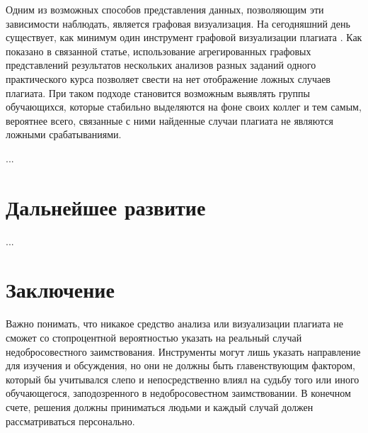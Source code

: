 \documentclass{article}
\begin{document}
Одним из возможных способов представления данных, позволяющим эти зависимости наблюдать, является графовая визуализация. На сегодняшний день существует, как минимум один инструмент графовой визуализации плагиата \citep{plagiarismGraph}. Как показано в связанной статье, использование агрегированных графовых представлений результатов нескольких анализов разных заданий одного практического курса позволяет свести на нет отображение ложных случаев плагиата. При таком подходе становится возможным выявлять группы обучающихся, которые стабильно выделяются на фоне своих коллег и тем самым, вероятнее всего, связанные с ними найденные случаи плагиата не являются ложными срабатываниями.

...

\section{Дальнейшее развитие}

...

\section{Заключение}

Важно понимать, что никакое средство анализа или визуализации плагиата не сможет со стопроцентной вероятностью указать на реальный случай недобросовестного заимствования. Инструменты могут лишь указать направление для изучения и обсуждения, но они не должны быть главенствующим фактором, который бы учитывался слепо и непосредственно влиял на судьбу того или иного обучающегося, заподозренного в недобросовестном заимствовании. В конечном счете, решения должны приниматься людьми и каждый случай должен рассматриваться персонально.



\end{document}
